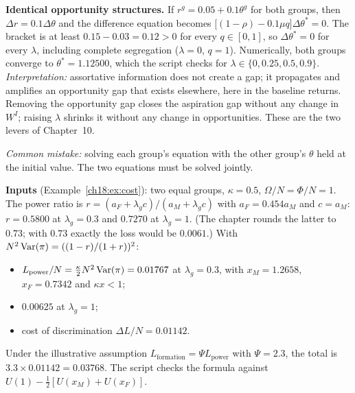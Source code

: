 \documentclass[../solutions_manual.tex]{subfiles}
\begin{document}
 \textbf{Identical opportunity structures.} If $r^g = 0.05 + 0.1\theta^g$ for both groups, then $\Delta r = 0.1\Delta\theta$ and the difference equation becomes $\big[(1-\rho) - 0.1\mu q\big]\Delta\theta^* = 0$. The bracket is at least $0.15 - 0.03 = 0.12 > 0$ for every $q \in [0,1]$, so $\Delta\theta^* = 0$ for every $\lambda$, including complete segregation ($\lambda = 0$, $q = 1$). Numerically, both groups converge to $\theta^* = 1.12500$, which the script checks for $\lambda \in \{0,\allowbreak 0.25,\allowbreak 0.5,\allowbreak 0.9\}$. \emph{Interpretation:} assortative information does not create a gap; it propagates and amplifies an opportunity gap that exists elsewhere, here in the baseline returns. Removing the opportunity gap closes the aspiration gap without any change in $W^I$; raising $\lambda$ shrinks it without any change in opportunities. These are the two levers of Chapter~10.

\emph{Common mistake:} solving each group's equation with the other group's $\theta$ held at the initial value. The two equations must be solved jointly.


\textbf{Inputs} (Example~\ref{ch18:ex:cost}): two equal groups, $\kappa = 0.5$, $\Omega/N = \Phi/N = 1$. The power ratio is $r = (a_F + \lambda_gc)/(a_M + \lambda_gc)$ with $a_F = 0.454a_M$ and $c = a_M$: $r = 0.5800$ at $\lambda_g = 0.3$ and $0.7270$ at $\lambda_g = 1$. (The chapter rounds the latter to $0.73$; with $0.73$ exactly the loss would be $0.0061$.) With $N^2\operatorname{Var}(\pi) = ((1-r)/(1+r))^2$:
\begin{itemize}
\item $L_{\text{power}}/N = \frac{\kappa}{2}N^2\operatorname{Var}(\pi) = 0.01767$ at $\lambda_g = 0.3$, with $x_M = 1.2658$, $x_F = 0.7342$ and $\kappa x < 1$;
\item $0.00625$ at $\lambda_g = 1$;
\item cost of discrimination $\Delta L/N = 0.01142$.
\end{itemize}
Under the illustrative assumption $L_{\text{formation}} = \Psi L_{\text{power}}$ with $\Psi = 2.3$, the total is $3.3 \times 0.01142 = 0.03768$. The script checks the formula against $U(1) - \frac12[U(x_M) + U(x_F)]$.
\end{document}
